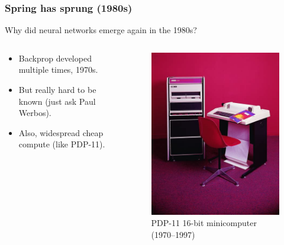 \documentclass{beamer}
\begin{document}
\begin{frame}
\frametitle{Spring has sprung (1980s)}

Why did neural networks emerge again in the 1980s?

\begin{columns}
\begin{column}{0.7\textwidth}
    \begin{itemize}
        \item Backprop developed multiple times, 1970s.
        \item But really hard to be known (just ask Paul Werbos).
        \item Also, widespread cheap compute (like PDP-11).
    \end{itemize}
\end{column}
\begin{column}{0.3\textwidth}
    \begin{figure}[t]
        \includegraphics[width=\textwidth]{figure/PDP-11.png}
        \centering
        \caption{PDP-11 16-bit minicomputer (1970--1997)}
    \end{figure}
\end{column}
\end{columns}
\end{frame}
\end{document}
